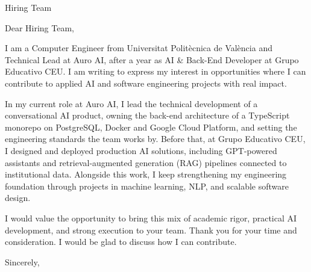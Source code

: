 \documentclass[11pt,a4paper]{letter}
\date{\today}
\begin{document}
\begin{letter}{Hiring Team}
\opening{Dear Hiring Team,}

I am a Computer Engineer from Universitat Politècnica de València and Technical Lead at Auro AI, after a year as AI \& Back-End Developer at Grupo Educativo CEU. I am writing to express my interest in opportunities where I can contribute to applied AI and software engineering projects with real impact.

In my current role at Auro AI, I lead the technical development of a conversational AI product, owning the back-end architecture of a TypeScript monorepo on PostgreSQL, Docker and Google Cloud Platform, and setting the engineering standards the team works by. Before that, at Grupo Educativo CEU, I designed and deployed production AI solutions, including GPT-powered assistants and retrieval-augmented generation (RAG) pipelines connected to institutional data. Alongside this work, I keep strengthening my engineering foundation through projects in machine learning, NLP, and scalable software design.

I would value the opportunity to bring this mix of academic rigor, practical AI development, and strong execution to your team. Thank you for your time and consideration. I would be glad to discuss how I can contribute.

\closing{Sincerely,}

\end{letter}
\end{document}
